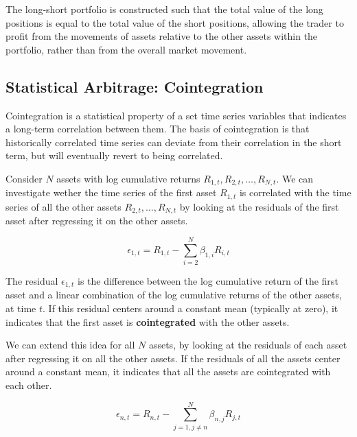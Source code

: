 \documentclass[12pt]{article}
\begin{document}
\vspace{10pt}
\noindent
The long-short portfolio is constructed such that the total value of the long positions is equal to the total value of the short positions, allowing the trader to profit from the movements of assets relative to the other assets within the portfolio, rather than from the overall market movement.

\subsection{Statistical Arbitrage: Cointegration}

Cointegration is a statistical property of a set time series variables that indicates a long-term correlation between them. The basis of cointegration is that historically correlated time series can deviate from their correlation in the short term, but will eventually revert to being correlated.

\vspace{10pt}
\noindent
Consider $N$ assets with log cumulative returns $R_{1,t}, R_{2,t}, \ldots, R_{N,t}$. We can investigate wether the time series of the first asset $R_{1,t}$ is correlated with the time series of all the other assets $R_{2,t}, \ldots, R_{N,t}$ by looking at the residuals of the first asset after regressing it on the other assets.

\begin{equation}
\epsilon_{1,t} = R_{1,t} - \sum_{i=2}^{N} \beta_{1,i} R_{i,t}
\label{eq:cointegration_single}
\end{equation}

\noindent
The residual $\epsilon_{1,t}$ is the difference between the log cumulative return of the first asset and a linear combination of the log cumulative returns of the other assets, at time $t$. If this residual centers around a constant mean (typically at zero), it indicates that the first asset is \textbf{cointegrated} with the other assets.

\noindent
We can extend this idea for all $N$ assets, by looking at the residuals of each asset after regressing it on all the other assets. If the residuals of all the assets center around a constant mean, it indicates that all the assets are cointegrated with each other.

\begin{equation}
\epsilon_{n,t} = R_{n,t} - \sum_{j=1, j \neq n}^{N} \beta_{n,j} R_{j,t}
\label{eq:cointegration_all}
\end{equation}
\end{document}

